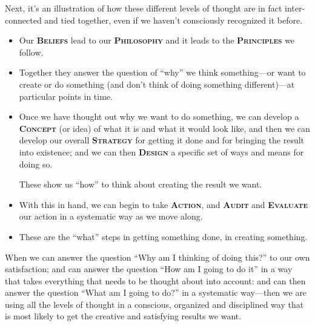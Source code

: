 \documentclass[a5paper]{article}
\begin{document}
Next, it's an illustration of how these different levels of thought are in fact inter-connected and tied together, even if we haven't consciously recognized it before.
\begin{itemize}
  \item Our \textbf{\scshape Beliefs} lead to our \textbf{\scshape Philosophy} and it leads to the \textbf{\scshape Principles} we follow.
  \item Together they answer the question of ``why'' we think something---or want to create or do something (and don't think of doing something
different)---at particular points in time.
  \item Once we have thought out why we want to do something, we can develop a \textbf{\scshape Concept} (or idea) of what it is and what it would look like, and then we can develop our overall \textbf{\scshape Strategy} for getting it done and for bringing the result into existence; and we can then \textbf{\scshape Design} a specific set of ways and means for doing so.
    
    These show us ``how'' to think about creating the result we want.
  \item With this in hand, we can begin to take \textbf{\scshape Action}, and \textbf{\scshape Audit} and \textbf{\scshape Evaluate} our action in a systematic way as we move along.
  \item These are the ``what'' steps in getting something done, in creating something.
\end{itemize}
\begin{figure}[h]
\centering
{}
\end{figure}

When we can answer the question ``Why am I thinking of doing this?'' to our own satisfaction; and can answer the question ``How am I going to do it'' in a way that takes everything that needs to be thought about into account: and can then answer the question ``What am I going to do?'' in a systematic way---then we are using all the levels of thought in a conscious, organized and disciplined way that is most likely to get the creative and satisfying results we want.
\end{document}
